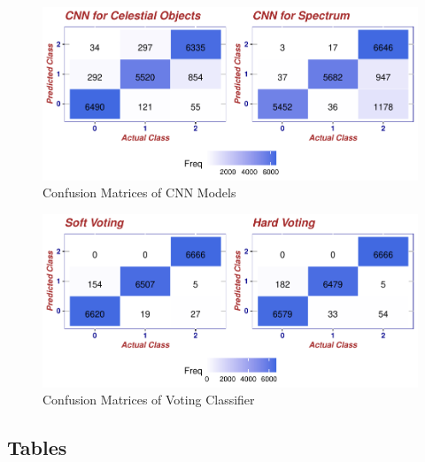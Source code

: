 \documentclass[
  11pt,
]{article}
\begin{document}
\begin{figure}
\centering
\includegraphics{final_report_files/figure-latex/cm-cnn-1.pdf}
\caption{\label{fig:cm-cnn}Confusion Matrices of CNN Models}
\end{figure}

\begin{figure}
\centering
\includegraphics{final_report_files/figure-latex/cm-vc-1.pdf}
\caption{\label{fig:cm-vc}Confusion Matrices of Voting Classifier}
\end{figure}

\quad

\newpage

\hypertarget{tables}{%
\subsection{Tables}\label{tables}}
\end{document}
